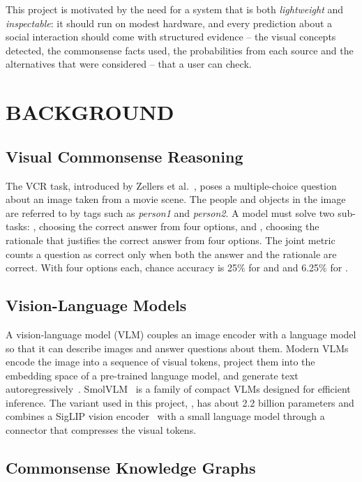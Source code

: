 This project is motivated by the need for a system that is both \emph{lightweight} and \emph{inspectable}: it should run on modest hardware, and every prediction about a social interaction should come with structured evidence -- the visual concepts detected, the commonsense facts used, the probabilities from each source and the alternatives that were considered -- that a user can check.

\section{BACKGROUND}

\subsection{Visual Commonsense Reasoning}

The VCR task, introduced by Zellers et al.~\cite{zellers2019vcr}, poses a multiple-choice question about an image taken from a movie scene. The people and objects in the image are referred to by tags such as \emph{person1} and \emph{person2}. A model must solve two sub-tasks: \QtoA, choosing the correct answer from four options, and \QAtoR, choosing the rationale that justifies the correct answer from four options. The joint metric \QtoAR{} counts a question as correct only when both the answer and the rationale are correct. With four options each, chance accuracy is 25\% for \QtoA{} and \QAtoR{} and 6.25\% for \QtoAR.

\subsection{Vision-Language Models}

A vision-language model (VLM) couples an image encoder with a language model so that it can describe images and answer questions about them. Modern VLMs encode the image into a sequence of visual tokens, project them into the embedding space of a pre-trained language model, and generate text autoregressively~\cite{liu2023llava,li2023blip2}. SmolVLM~\cite{marafioti2025smolvlm} is a family of compact VLMs designed for efficient inference. The variant used in this project, , has about 2.2 billion parameters and combines a SigLIP vision encoder~\cite{zhai2023siglip} with a small language model through a connector that compresses the visual tokens.

\subsection{Commonsense Knowledge Graphs}

